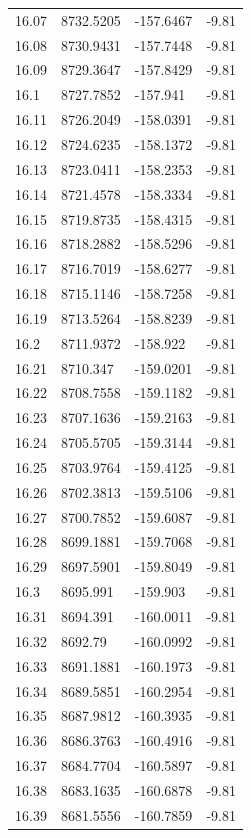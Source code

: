 \begin{table}[H]
\begin{tabular}{llll}
16.07 & 8732.5205 & -157.6467 & -9.81 \\
16.08 & 8730.9431 & -157.7448 & -9.81 \\
16.09 & 8729.3647 & -157.8429 & -9.81 \\
16.1 & 8727.7852 & -157.941 & -9.81 \\
16.11 & 8726.2049 & -158.0391 & -9.81 \\
16.12 & 8724.6235 & -158.1372 & -9.81 \\
16.13 & 8723.0411 & -158.2353 & -9.81 \\
16.14 & 8721.4578 & -158.3334 & -9.81 \\
16.15 & 8719.8735 & -158.4315 & -9.81 \\
16.16 & 8718.2882 & -158.5296 & -9.81 \\
16.17 & 8716.7019 & -158.6277 & -9.81 \\
16.18 & 8715.1146 & -158.7258 & -9.81 \\
16.19 & 8713.5264 & -158.8239 & -9.81 \\
16.2 & 8711.9372 & -158.922 & -9.81 \\
16.21 & 8710.347 & -159.0201 & -9.81 \\
16.22 & 8708.7558 & -159.1182 & -9.81 \\
16.23 & 8707.1636 & -159.2163 & -9.81 \\
16.24 & 8705.5705 & -159.3144 & -9.81 \\
16.25 & 8703.9764 & -159.4125 & -9.81 \\
16.26 & 8702.3813 & -159.5106 & -9.81 \\
16.27 & 8700.7852 & -159.6087 & -9.81 \\
16.28 & 8699.1881 & -159.7068 & -9.81 \\
16.29 & 8697.5901 & -159.8049 & -9.81 \\
16.3 & 8695.991 & -159.903 & -9.81 \\
16.31 & 8694.391 & -160.0011 & -9.81 \\
16.32 & 8692.79 & -160.0992 & -9.81 \\
16.33 & 8691.1881 & -160.1973 & -9.81 \\
16.34 & 8689.5851 & -160.2954 & -9.81 \\
16.35 & 8687.9812 & -160.3935 & -9.81 \\
16.36 & 8686.3763 & -160.4916 & -9.81 \\
16.37 & 8684.7704 & -160.5897 & -9.81 \\
16.38 & 8683.1635 & -160.6878 & -9.81 \\
16.39 & 8681.5556 & -160.7859 & -9.81 \\

\end{tabular}
\end{table}
